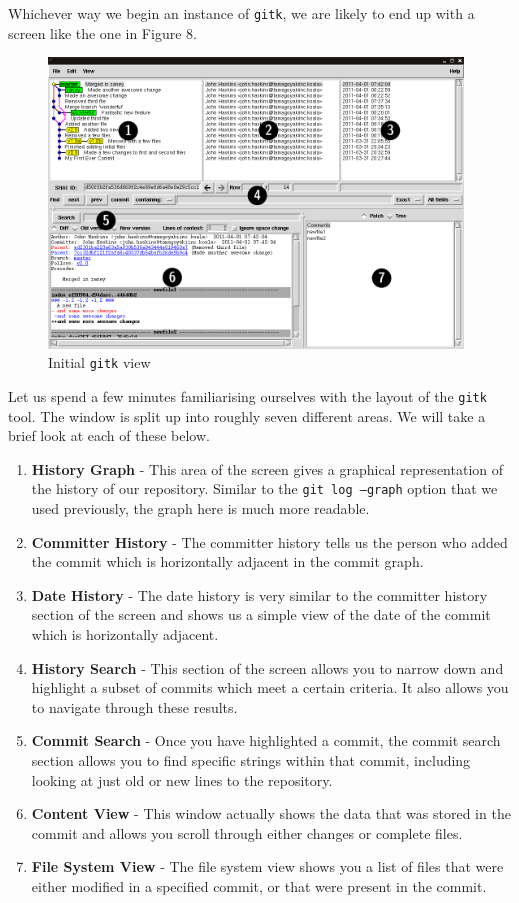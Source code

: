 Whichever way we begin an instance of \texttt{gitk}, we are likely to end up with a screen like the one in Figure 8.

\begin{figure}[hbt]
\centering
\includegraphics[width=11cm]{images/f-w5-d8.png}
\caption{Initial \texttt{gitk} view}
\end{figure} 

Let us spend a few minutes familiarising ourselves with the layout of the \texttt{gitk} tool.  The window is split up into roughly seven different areas.  We will take a brief look at each of these below.

\begin{enumerate}
\item \textbf{History Graph} - This area of the screen gives a graphical representation of the history of our repository.  Similar to the \texttt{git log --graph} option that we used previously, the graph here is much more readable.
\item \textbf{Committer History} - The committer history tells us the person who added the commit which is horizontally adjacent in the commit graph.  
\item \textbf{Date History} - The date history is very similar to the committer history section of the screen and shows us a simple view of the date of the commit which is horizontally adjacent.
\item \textbf{History Search} - This section of the screen allows you to narrow down and highlight a subset of commits which meet a certain criteria.  It also allows you to navigate through these results.
\item \textbf{Commit Search} - Once you have highlighted a commit, the commit search section allows you to find specific strings within that commit, including looking at just old or new lines to the repository.
\item \textbf{Content View} - This window actually shows the data that was stored in the commit and allows you scroll through either changes or complete files.
\item \textbf{File System View} - The file system view shows you a list of files that were either modified in a specified commit, or that were present in the commit.
\end{enumerate}

